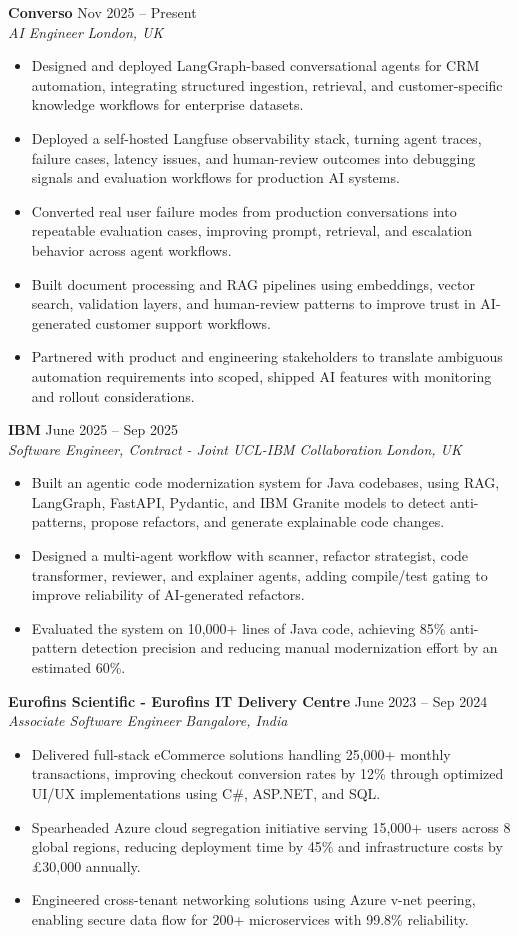 \documentclass[10pt,letterpaper]{article}
\newcommand{\role}[4]{
  \vspace{2pt}
  {\bfseries\color{ink} #1} \hfill {\small\color{muted} #2}\\
  {\itshape\color{muted} #3} \hfill {\small\itshape\color{muted} #4}
}
\begin{document}
\role{Converso}{Nov 2025 -- Present}{AI Engineer}{London, UK}
\begin{itemize}
  \item Designed and deployed LangGraph-based conversational agents for CRM automation, integrating structured ingestion, retrieval, and customer-specific knowledge workflows for enterprise datasets.
  \item Deployed a self-hosted Langfuse observability stack, turning agent traces, failure cases, latency issues, and human-review outcomes into debugging signals and evaluation workflows for production AI systems.
  \item Converted real user failure modes from production conversations into repeatable evaluation cases, improving prompt, retrieval, and escalation behavior across agent workflows.
  \item Built document processing and RAG pipelines using embeddings, vector search, validation layers, and human-review patterns to improve trust in AI-generated customer support workflows.
  \item Partnered with product and engineering stakeholders to translate ambiguous automation requirements into scoped, shipped AI features with monitoring and rollout considerations.
\end{itemize}

\role{IBM}{June 2025 -- Sep 2025}{Software Engineer, Contract - Joint UCL-IBM Collaboration}{London, UK}
\begin{itemize}
  \item Built an agentic code modernization system for Java codebases, using RAG, LangGraph, FastAPI, Pydantic, and IBM Granite models to detect anti-patterns, propose refactors, and generate explainable code changes.
  \item Designed a multi-agent workflow with scanner, refactor strategist, code transformer, reviewer, and explainer agents, adding compile/test gating to improve reliability of AI-generated refactors.
  \item Evaluated the system on 10,000+ lines of Java code, achieving 85\% anti-pattern detection precision and reducing manual modernization effort by an estimated 60\%.
\end{itemize}

\newpage
\role{Eurofins Scientific - Eurofins IT Delivery Centre}{June 2023 -- Sep 2024}{Associate Software Engineer}{Bangalore, India}
\begin{itemize}
  \item Delivered full-stack eCommerce solutions handling 25,000+ monthly transactions, improving checkout conversion rates by 12\% through optimized UI/UX implementations using C\#, ASP.NET, and SQL.
  \item Spearheaded Azure cloud segregation initiative serving 15,000+ users across 8 global regions, reducing deployment time by 45\% and infrastructure costs by \pounds30,000 annually.
  \item Engineered cross-tenant networking solutions using Azure v-net peering, enabling secure data flow for 200+ microservices with 99.8\% reliability.
\end{itemize}
\end{document}
